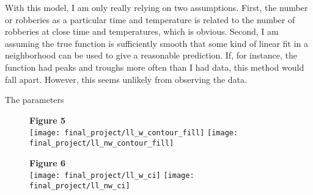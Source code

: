 \documentclass[11pt]{article}
\theoremstyle{definition}
\begin{document}
With this model, I am only really relying on two assumptions. First, the number or robberies as a particular time and temperature is related to the number of robberies at close time and temperatures, which is obvious. Second, I am assuming the true function is sufficiently smooth that some kind of linear fit in a  neighborhood can be used to give a reasonable prediction. If, for instance, the function had peaks and troughs more often than I had data, this method would fall apart. However, this seems unlikely from observing the data. \par
The parameters
\begin{figure}[h]
    {\bf Figure 5} \\
    \texttt{[image: final\_project/ll\_w\_contour\_fill]}
    \texttt{[image: final\_project/ll\_nw\_contour\_fill]}
\end{figure}
\begin{figure}[h]
    {\bf Figure 6} \\
    \texttt{[image: final\_project/ll\_w\_ci]}
    \texttt{[image: final\_project/ll\_nw\_ci]}
\end{figure}
\end{document}
